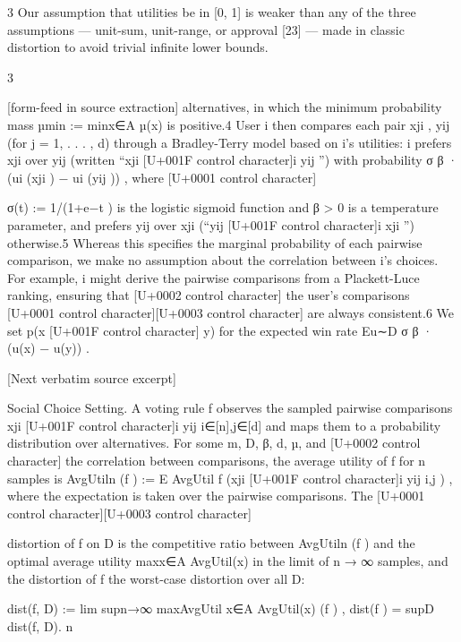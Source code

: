 \documentclass[10pt]{article}
\begin{document}
\begin{ReviewVerbatim}
    3
     Our assumption that utilities be in [0, 1] is weaker than any of the three assumptions — unit-sum, unit-range,
or approval [23] — made in classic distortion to avoid trivial infinite lower bounds.


                                                           3

[form-feed in source extraction]
alternatives, in which the minimum probability mass µmin := minx∈A µ(x) is positive.4 User i
then compares each pair {xji , yij } (for j = 1, . . . , d) through a Bradley-Terry model based on i’s
utilities: i prefers xji over yij (written “xji [U+001F control character]i yij ”) with probability σ β · (ui (xji ) − ui (yij )) , where
                                                                                                        [U+0001 control character]

σ(t) := 1/(1+e−t ) is the logistic sigmoid function and β > 0 is a temperature parameter, and prefers
yij over xji (“yij [U+001F control character]i xji ”) otherwise.5 Whereas this specifies the marginal probability of each pairwise
comparison, we make no assumption about the correlation between i’s choices. For example, i might
derive the pairwise comparisons from a Plackett-Luce ranking, ensuring that      [U+0002 control character] the user’s comparisons  [U+0001 control character][U+0003 control character]
are always consistent.6 We set p(x [U+001F control character] y) for the expected win rate Eu∼D σ β · (u(x) − u(y)) .

[Next verbatim source excerpt]

Social Choice Setting. A voting rule f observes the sampled pairwise comparisons {xji [U+001F control character]i
yij }i∈[n],j∈[d] and maps them to a probability distribution over alternatives. For some m, D, β, d, µ,
and
  [U+0002 control character] the correlation between comparisons,     the average utility of f for n samples is AvgUtiln (f ) :=
E AvgUtil f ({xji [U+001F control character]i yij }i,j ) , where the expectation is taken over the pairwise comparisons. The
                               [U+0001 control character][U+0003 control character]

distortion of f on D is the competitive ratio between AvgUtiln (f ) and the optimal average utility
maxx∈A AvgUtil(x) in the limit of n → ∞ samples, and the distortion of f the worst-case distortion
over all D:

            dist(f, D) := lim supn→∞ maxAvgUtil
                                        x∈A AvgUtil(x)
                                                (f )   ,               dist(f ) = supD dist(f, D).
                                                       n




\end{ReviewVerbatim}
\end{document}
